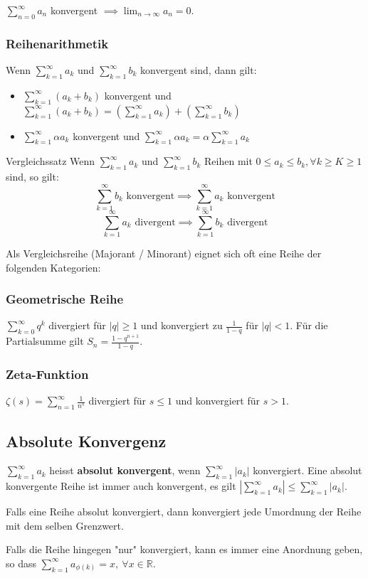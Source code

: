\documentclass[a4paper,10pt]{article}
\def\limn{\lim_{n\to \infty}}
\def\sumk{\sum_{k=1}^\infty}
\def\sumn{\sum_{n=0}^\infty}
\def\R{\mathbb{R}}
\begin{document}
$\sumn a_n$ konvergent $\implies \limn a_n = 0$.

\subsubsection{Reihenarithmetik}
Wenn $\sumk a_k$ und $\sumk b_k$ konvergent sind, dann gilt:
\begin{itemize}
 \item $\sumk (a_k + b_k)$ konvergent und $\sumk (a_k + b_k) = \left( \sumk a_k \right) + \left( \sumk b_k \right)$
 \item $\sumk \alpha a_k$ konvergent und $\sumk \alpha a_k = \alpha \sumk a_k$
\end{itemize}


\begin{mainbox}{Vergleichssatz}
Wenn $\sumk a_k$ und $\sumk b_k$ Reihen mit $0 \le a_k \le b_k, \forall k \ge K \ge 1$ sind, so gilt:
$$\sumk b_k \text{ konvergent} \implies \sumk a_k \text{ konvergent}$$ 
$$\sumk a_k \text{ divergent} \implies \sumk b_k \text{ divergent}$$ 
\end{mainbox}

Als Vergleichsreihe (Majorant / Minorant) eignet sich oft eine Reihe der folgenden Kategorien:
\subsubsection{Geometrische Reihe} 
$\sum_{k=0}^\infty q^k$ divergiert für $|q| \ge 1$ und konvergiert zu $\frac{1}{1 - q}$ für $|q| < 1$. Für die Partialsumme gilt $S_n = \frac{1 - q^{n+1}}{1 - q}$.
\subsubsection{Zeta-Funktion}
$\zeta(s) = \sum_{n=1}^\infty \frac{1}{n^s}$ divergiert für $s \le 1$ und konvergiert für $s > 1$.

\subsection{Absolute Konvergenz}
$\sumk a_k$ heisst \textbf{absolut konvergent}, wenn $\sumk |a_k|$ konvergiert. Eine absolut konvergente Reihe ist immer auch konvergent, es gilt $|\sumk a_k| \le \sumk |a_k|$.

Falls eine Reihe absolut konvergiert, dann konvergiert jede Umordnung der Reihe mit dem selben Grenzwert.

Falls die Reihe hingegen "nur" konvergiert, kann es immer eine Anordnung geben, so dass $\sum_{k=1}^\infty a_{\phi(k)} = x, \ \forall x\in \R$.
\end{document}
